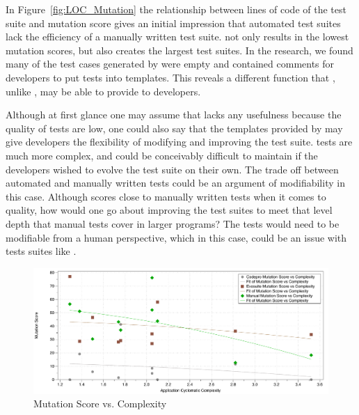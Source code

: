 In Figure~\ref{fig:LOC_Mutation} the relationship between lines of code of the test suite and mutation score gives an initial impression that automated test suites lack the efficiency of a manually written test suite. \codepro not only results in the lowest mutation scores, but also creates the largest test suites. In the research, we found many of the test cases generated by \codepro were empty and contained comments for developers to put tests into templates. This reveals a different function that \codepro, unlike \evo, may be able to provide to developers. 

Although at first glance one may assume that \codepro lacks any usefulness because the quality of tests are low, one could also say that the templates provided by \codepro may give developers the flexibility of modifying and improving the test suite. \evo tests are much more complex, and could be conceivably difficult to maintain if the developers wished to evolve the test suite on their own. The trade off between automated and manually written tests could be an argument of modifiability in this case. Although \evo scores close to manually written tests when it comes to quality, how would one go about improving the test suites to meet that level depth that manual tests cover in larger programs? The tests would need to be modifiable from a human perspective, which in this case, could be an issue with tests suites like \evo.

\begin{figure}[!t]
\centering
  \includegraphics[width=\textwidth]{Complexity_Mutation}
    \caption{Mutation Score vs. Complexity}
  \label{fig:Complexity_Mutation}
\end{figure}


